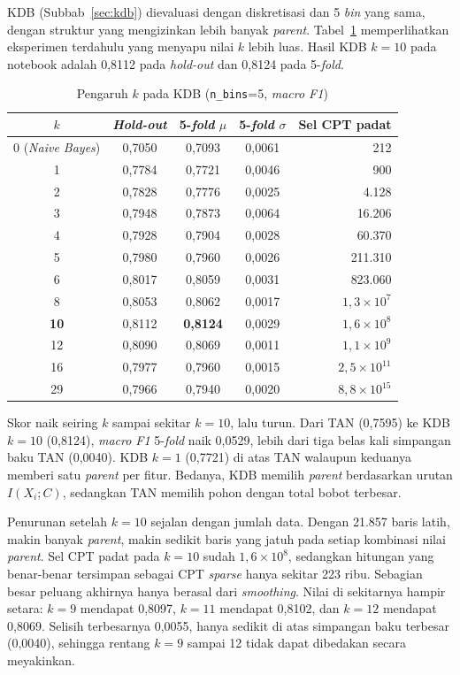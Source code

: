 KDB (Subbab~\ref{sec:kdb}) dievaluasi dengan diskretisasi dan 5 \textit{bin}
yang sama, dengan struktur yang mengizinkan lebih banyak \textit{parent}.
Tabel~\ref{tab:kdb} memperlihatkan eksperimen terdahulu yang menyapu nilai $k$
lebih luas. Hasil KDB $k=10$ pada notebook adalah 0,8112 pada \textit{hold-out}
dan 0,8124 pada 5-\textit{fold}.

\begin{table}[H]
	\centering
	\caption{Pengaruh $k$ pada KDB (\texttt{n\_bins}=5, \textit{macro F1})}
	\label{tab:kdb}
	\begin{tabular}{c c c c r}
		\toprule
		$k$ & \textbf{\textit{Hold-out}} & \textbf{5-\textit{fold} $\mu$} & \textbf{5-\textit{fold} $\sigma$} & \textbf{Sel CPT padat} \\
		\midrule
		0 (\textit{Naive Bayes}) & 0,7050 & 0,7093 & 0,0061 & 212 \\
		1 & 0,7784 & 0,7721 & 0,0046 & 900 \\
		2 & 0,7828 & 0,7776 & 0,0025 & 4.128 \\
		3 & 0,7948 & 0,7873 & 0,0064 & 16.206 \\
		4 & 0,7928 & 0,7904 & 0,0028 & 60.370 \\
		5 & 0,7980 & 0,7960 & 0,0026 & 211.310 \\
		6 & 0,8017 & 0,8059 & 0,0031 & 823.060 \\
		8 & 0,8053 & 0,8062 & 0,0017 & $1{,}3\times10^{7}$ \\
		\textbf{10} & 0,8112 & \textbf{0,8124} & 0,0029 & $1{,}6\times10^{8}$ \\
		12 & 0,8090 & 0,8069 & 0,0011 & $1{,}1\times10^{9}$ \\
		16 & 0,7977 & 0,7960 & 0,0015 & $2{,}5\times10^{11}$ \\
		29 & 0,7966 & 0,7940 & 0,0020 & $8{,}8\times10^{15}$ \\
		\bottomrule
	\end{tabular}
\end{table}

Skor naik seiring $k$ sampai sekitar $k=10$, lalu turun. Dari TAN (0,7595) ke KDB
$k=10$ (0,8124), \textit{macro F1} 5-\textit{fold} naik 0,0529, lebih dari tiga
belas kali simpangan baku TAN (0,0040). KDB $k=1$ (0,7721) di atas TAN walaupun keduanya
memberi satu \textit{parent} per fitur. Bedanya, KDB memilih \textit{parent}
berdasarkan urutan $I(X_i;C)$, sedangkan TAN memilih pohon dengan total bobot
terbesar.

Penurunan setelah $k=10$ sejalan dengan jumlah data. Dengan 21.857 baris latih,
makin banyak \textit{parent}, makin sedikit baris yang jatuh pada setiap
kombinasi nilai \textit{parent}. Sel CPT padat pada $k=10$ sudah
$1{,}6\times10^{8}$, sedangkan hitungan yang benar-benar tersimpan sebagai CPT
\textit{sparse} hanya sekitar 223 ribu. Sebagian besar peluang akhirnya hanya
berasal dari \textit{smoothing}. Nilai di sekitarnya hampir setara: $k=9$
mendapat 0,8097, $k=11$ mendapat 0,8102, dan $k=12$ mendapat 0,8069. Selisih
terbesarnya 0,0055, hanya sedikit di atas simpangan baku terbesar (0,0040), sehingga
rentang $k=9$ sampai 12 tidak dapat dibedakan secara meyakinkan.

